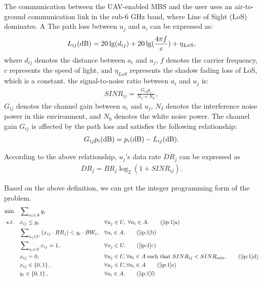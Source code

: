 \documentclass[11pt,a4paper]{article}
\begin{document}
The communication between the UAV-enabled MBS and the user uses an air-to-ground communication link in the sub-6 GHz band, where Line of Sight (LoS) dominates. A The path loss between $u_j$ and $a_i$ can be expressed as:
\begin{eqnarray}
	{L_{ij}}({\rm{dB}}) = 20\lg ({d_{ij}}) + 20\lg (\frac{{4\pi f}}{c}) + {\eta _{LoS}},
\end{eqnarray}
where $d_{ij}$ denotes the distance between $a_i$ and $u_j$, $f$ denotes the carrier frequency, $c$ represents the speed of light, and $\eta _{LoS}$ represents the shadow fading loss of LoS, which is a constant. the signal-to-noise ratio between $a_i$ and $u_j$ is:
\begin{eqnarray}
	SINR_{ij} = \frac{{{G_{ij}}{p_i}}}{{{N_I} + {N_0}}},
\end{eqnarray}
$G_{ij}$ denotes the channel gain between $a_i$ and $u_j$, $N_I$ denotes the interference noise power in this environment, and $N_0$ denotes the white noise power. The channel gain $G_{ij}$ is affected by the path loss and satisfies the following relationship:
\begin{eqnarray}
	{G_{ij}}{p_i}({\rm{dB}}) = {p_i}({\rm{dB}}) - {L_{ij}}({\rm{dB}}).
\end{eqnarray}


According to the above relationship, $u_j$'s data rate $DR_j$ can be expressed as
\begin{eqnarray}
	D{R_j} = B{R_j}{\log _2}(1 + SIN{R_{ij}}).
\end{eqnarray}


%
Based on the above definition, we can get the integer programming form of the problem.
\begin{align}
	\min \quad  & \sum\nolimits_{{a_i} \in A} {{y_i}} && \label{ip:1}\\
	s.t.\quad &  {x_{ij}} \le {y_i}  &&\forall {u_j} \in U,\;\forall {a_i} \in A. \tag{\ref{ip:1}{a}}\label{ip:1.1}\\
	&  \sum\nolimits_{{u_j} \in U} {({x_{ij}} \cdot B{R_j})}  \le {y_i} \cdot B{W_i},&&\forall {a_i} \in A. \tag{\ref{ip:1}{b}}\label{ip:1.2}\\
	&  \sum\nolimits_{{a_i} \in S} {{x_{ij}}}  = 1,&&\forall {u_j} \in U. \tag{\ref{ip:1}{c}}\label{ip:1.3}\\
	&  {x_{ij}} = 0,&&\forall {u_j} \in U,\forall {a_i} \in A\;{\text{such that }}SIN{R_{ij}} < SIN{R_{\min }}, \tag{\ref{ip:1}{d}}\label{ip:1.4}\\
	&  {x_{ij}} \in \left\{ {0,1} \right\},&&\forall u_j \in U,\forall {a_i} \in A \tag{\ref{ip:1}{e}}\label{ip:1.5}\\
	&  {y_{i}} \in \left\{ {0,1} \right\},&&\forall {a_i} \in A. \tag{\ref{ip:1}{f}}\label{ip:1.6}
\end{align}
\end{document}
